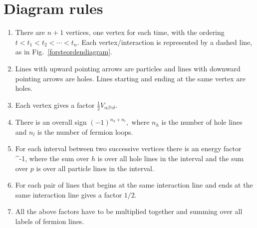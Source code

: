 \chapter{Diagram rules} \label{diagramregler}

\begin{enumerate}
\item There are $n+1$ vertices, one vertex for each time, with the ordering
$t<t_1<t_2 < \cdots < t_n.$ Each vertex/interaction is represented by a 
dashed line, as in Fig.~\ref{forsteordendiagram}. 

\item Lines with upward pointing arrows are particles and lines with 
downward pointing arrows are holes. Lines starting and ending at the same 
vertex are holes.

\item Each vertex gives a factor $\frac{1}{2}V_{\alpha\beta\gamma\delta}.$

\item There is an overall sign $(-1)^{n_h+n_l},$ where $n_h$ is the number
of hole lines and $n_l$ is the number of fermion loops.

\item For each interval between two successive vertices there is an energy
factor 
\beq
{}^{-1},
\eeq
where the sum over $h$ is over all hole lines in the interval and the sum 
over $p$ is over all particle lines in the interval.

\item For each pair of lines that begins at the same interaction line and 
ends at the same interaction line gives a factor $1/2.$

\item All the above factors have to be multiplied together and summing over 
all labels of fermion lines. 











\end{enumerate}
